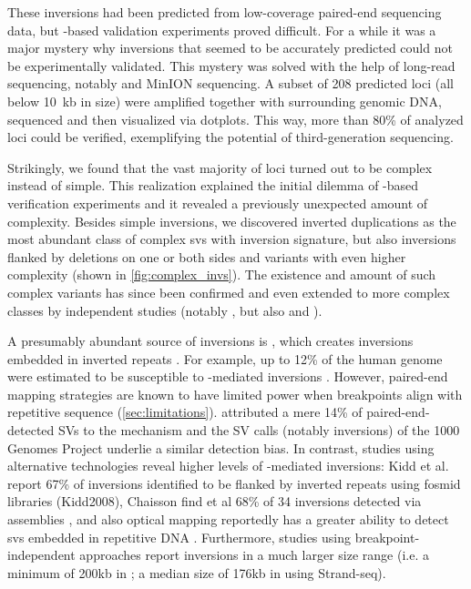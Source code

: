 These inversions had been predicted from low-coverage paired-end sequencing data,
but \pcr-based validation experiments proved difficult. For a while it was a
major mystery why inversions that seemed to be accurately predicted could not be
experimentally validated. This mystery was solved with the help of long-read
sequencing, notably \pacbio and \ont MinION sequencing. A subset of 208 predicted
loci (all below 10~kb in size) were amplified together with surrounding genomic
DNA, sequenced and then visualized via dotplots. This way, more than 80\% of
analyzed loci could be verified, exemplifying the potential of third-generation
sequencing.

Strikingly, we found that the vast majority of loci turned out to be complex
instead of simple. This realization explained the initial dilemma of
\pcr-based verification experiments and it revealed a previously unexpected
amount of complexity. Besides simple inversions, we discovered inverted
duplications as the most abundant class of complex \acp{sv} with inversion
signature, but also inversions flanked by deletions on one or both sides and
variants with even higher complexity (shown in \cref{fig:complex_invs}). The
existence and amount of such complex variants has since been confirmed and even
extended to more complex classes by independent studies (notably
\cite{Collins2017}, but also \cite{Sanders2016} and \cite[fig. 7]{English2015}).

A presumably abundant source of inversions is \nahr, which creates
inversions embedded in inverted repeats \citep{Carvalho2016}. For example, up to
12\% of the human genome were estimated to be susceptible to \nahr-mediated
inversions \citep{Dittwald2013}. However, paired-end mapping strategies are
known to have limited power when \sv breakpoints align with repetitive sequence
(\cref{sec:limitations}). \cite{Korbel2007} attributed a mere 14\% of
paired-end-detected SVs to the \nahr mechanism and the SV calls (notably
inversions) of the 1000 Genomes Project underlie a similar detection bias.
In contrast, studies using alternative
technologies reveal higher levels of \nahr-mediated inversions: Kidd et al.
report 67\% of inversions identified to be flanked by inverted repeats using
fosmid libraries (Kidd2008), Chaisson find et al 68\% of 34 inversions detected
via \pacbio assemblies \citep{Chaisson2014}, and also optical mapping reportedly
has a greater ability to detect \acp{sv} embedded in repetitive DNA
\citep[fig. 6]{Teague2010}. Furthermore, studies using breakpoint-independent
approaches report inversions in a much larger size range (i.e. a minimum of 200kb
in \cite{Bansal2007}; a median size of 176kb in \cite{Sanders2016} using
Strand-seq).

